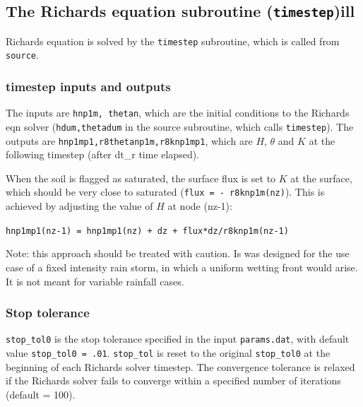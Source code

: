 \documentclass{article}
\newcommand{\code}[1]{\texttt{#1}}
\begin{document}
	
 

\subsection{The Richards equation subroutine (\code{timestep})ill }

Richards equation is solved by the \code{timestep} subroutine, which is called from \code{source}.
	
\subsubsection*{timestep inputs and outputs }
The inputs are \code{hnp1m, thetan}, which are the initial conditions to the Richards eqn solver (\code{hdum,thetadum} in the source subroutine, which calls \code{timestep}).  
The outputs are  \code{hnp1mp1,r8thetanp1m,r8knp1mp1}, which are  $H$, $\theta$ and $K$ at the following timestep (after dt\_r  time elapsed).



When the soil is flagged as saturated,  the surface flux is set to $K$ at the surface, which should be very close to saturated (\code{flux  = - r8knp1m(nz)}).  This is achieved by adjusting the value of $H$ at node (nz-1):
\begin{center}
\code{hnp1mp1(nz-1) = hnp1mp1(nz) + dz + flux*dz/r8knp1m(nz-1)}	
\end{center}

Note: this approach should be treated with caution.  Is was designed for the use case of a fixed intensity rain storm, in which a uniform wetting front would arise.  It is not meant for variable rainfall cases.

\subsubsection*{Stop tolerance }
\code{stop\_tol0} is the stop tolerance specified in the input \code{params.dat}, with default value \code{stop\_tol0 = .01}.  
\code{stop\_tol} is reset to the original \code{stop\_tol0}  at the beginning of each Richards solver timestep.  The convergence tolerance  is relaxed if the Richards solver fails to converge within a specified number of iterations (default = 100).
\end{document}
